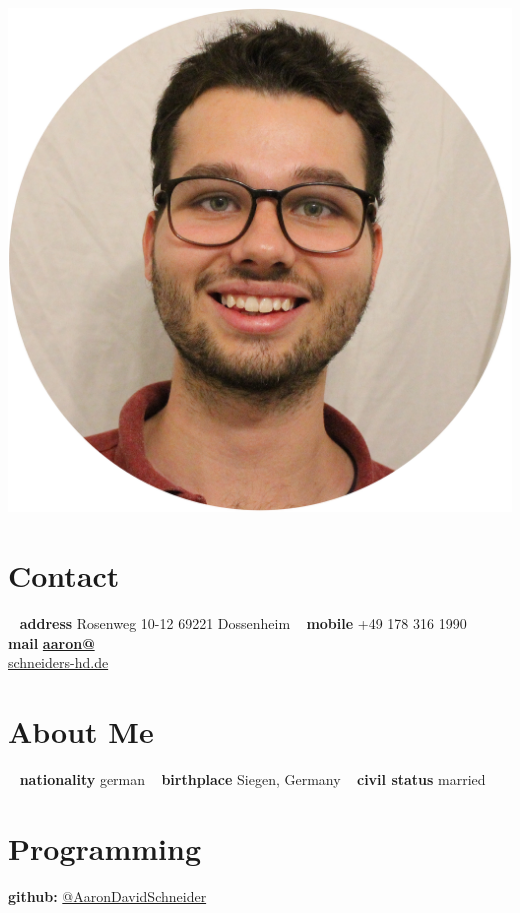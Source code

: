 \documentclass[]{friggeri-cv}
\begin{document}



\begin{aside}
  \includegraphics[scale=0.04]{img/Aaron_Circle}
\section{Contact}
~
\textbf{address}
   Rosenweg 10-12
   69221 Dossenheim
   ~
 \textbf{mobile}
 +49 178 316 1990
 ~
 \textbf{mail}
   \href{mailto:aaron@schneiders-hd.de}{\textbf{aaron@}\\schneiders-hd.de}
\section{About Me}
~  
\textbf{nationality}
  german
   ~
  \textbf{birthplace}
  Siegen, Germany
  ~
  \textbf{civil status}
  married
  \section{Programming}
    \textbf{github:} 
    \href{https://github.com/AaronDavidSchneider/}{@AaronDavidSchneider}

\end{aside}
\end{document}
